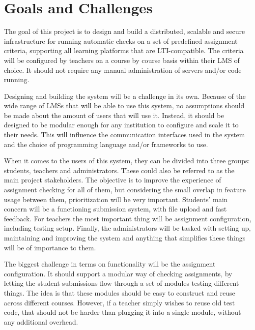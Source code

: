 \chapter{Goals and Challenges}
\label{goals}

The goal of this project is to design and build a distributed, scalable and secure infrastructure for running automatic checks on a set of predefined assignment criteria, supporting all learning platforms that are LTI-compatible. The criteria will be configured by teachers on a course by course basis within their LMS of choice. It should not require any manual administration of servers and/or code running.

Designing and building the system will be a challenge in its own. Because of the wide range of LMSs that will be able to use this system, no assumptions should be made about the amount of users that will use it. Instead, it should be designed to be modular enough for any institution to configure and scale it to their needs. This will influence the communication interfaces used in the system and the choice of programming language and/or frameworks to use.

When it comes to the users of this system, they can be divided into three groups: students, teachers and administrators. These could also be referred to as the main project stakeholders. The objective is to improve the experience of assignment checking for all of them, but considering the small overlap in feature usage between them, prioritization will be very important. Students' main concern will be a functioning submission system, with file upload and fast feedback. For teachers the most important thing will be assignment configuration, including testing setup. Finally, the administrators will be tasked with setting up, maintaining and improving the system and anything that simplifies these things will be of importance to them.

The biggest challenge in terms on functionality will be the assignment configuration. It should support a modular way of checking assignments, by letting the student submissions flow through a set of modules testing different things. The idea is that these modules should be easy to construct and reuse across different courses. However, if a teacher simply wishes to reuse old test code, that should not be harder than plugging it into a single module, without any additional overhead.